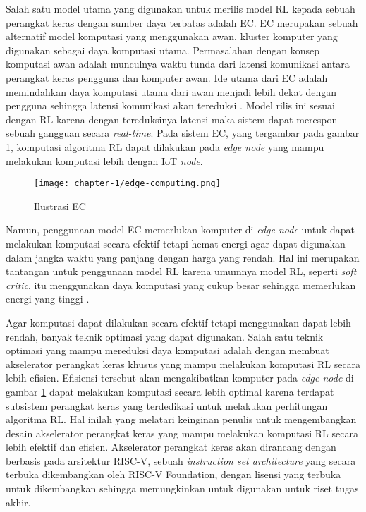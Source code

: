Salah satu model utama yang digunakan untuk merilis model RL kepada sebuah perangkat keras dengan sumber daya terbatas adalah \ac{EC}. \ac{EC} merupakan sebuah alternatif model komputasi yang menggunakan awan, kluster komputer yang digunakan sebagai daya komputasi utama. Permasalahan dengan konsep komputasi awan adalah munculnya waktu tunda dari latensi komunikasi antara perangkat keras pengguna dan komputer awan. Ide utama dari \ac{EC} adalah memindahkan daya komputasi utama dari awan menjadi lebih dekat dengan pengguna sehingga latensi komunikasi akan tereduksi \parencite{edgecomputing}. Model rilis ini sesuai dengan RL karena dengan tereduksinya latensi maka sistem dapat merespon sebuah gangguan secara \textit{real-time}. Pada sistem \ac{EC}, yang tergambar pada gambar \ref{fig:edge-computing}, komputasi algoritma RL dapat dilakukan pada \textit{edge node} yang mampu melakukan komputasi lebih dengan \ac{IoT} \textit{node}.

\begin{figure}[h]
	\centering
	\texttt{[image: chapter-1/edge-computing.png]}
	\caption{Ilustrasi \acl{EC}}
	\label{fig:edge-computing}
\end{figure}

Namun, penggunaan model \ac{EC} memerlukan komputer di \textit{edge node} untuk dapat melakukan komputasi secara efektif tetapi hemat energi agar dapat digunakan dalam jangka waktu yang panjang dengan harga yang rendah. Hal ini merupakan tantangan untuk penggunaan model \ac{RL} karena umumnya model \ac{RL}, seperti \textit{soft critic}, itu menggunakan daya komputasi yang cukup besar sehingga memerlukan energi yang tinggi \parencite{wang2022efficient}.

Agar komputasi dapat dilakukan secara efektif tetapi menggunakan dapat lebih rendah, banyak teknik optimasi yang dapat digunakan. Salah satu teknik optimasi yang mampu mereduksi daya komputasi adalah dengan membuat akselerator perangkat keras khusus yang mampu melakukan komputasi RL secara lebih efisien. Efisiensi tersebut akan mengakibatkan komputer pada \textit{edge node} di gambar \ref{fig:edge-computing} dapat melakukan komputasi secara lebih optimal karena terdapat subsistem perangkat keras yang terdedikasi untuk melakukan perhitungan algoritma RL. Hal inilah yang melatari keinginan penulis untuk mengembangkan desain akselerator perangkat keras yang mampu melakukan komputasi RL secara lebih efektif dan efisien. Akselerator perangkat keras akan dirancang dengan berbasis pada arsitektur RISC-V, sebuah \textit{instruction set architecture} yang secara terbuka dikembangkan oleh RISC-V Foundation, dengan lisensi yang terbuka untuk dikembangkan sehingga memungkinkan untuk digunakan untuk riset tugas akhir.
